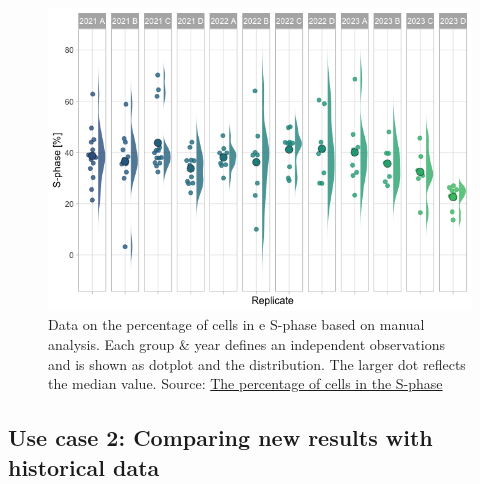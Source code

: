 \documentclass[
]{agujournal2019}
\begin{document}
\begin{figure}[H]

{\centering \includegraphics{index_files/figure-latex/fig-superplot-output-2.png}

}

\caption{\label{fig-superplot}Data on the percentage of cells in e
S-phase based on manual analysis. Each group \& year defines an
independent observations and is shown as dotplot and the distribution.
The larger dot reflects the median value. Source:
\href{https://JoachimGoedhart.github.io/MS-StudentSourcing/notebooks/PreciSe-preview.html\#cell-fig-superplot}{The
percentage of cells in the S-phase}}

\end{figure}

\hypertarget{use-case-2-comparing-new-results-with-historical-data}{%
\subsection*{Use case 2: Comparing new results with historical
data}\label{use-case-2-comparing-new-results-with-historical-data}}
\end{document}
